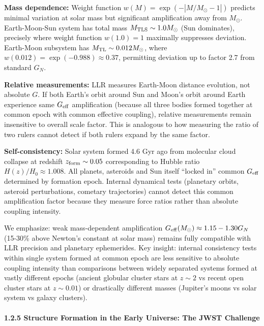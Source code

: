 \documentclass[11pt,a4paper]{article}
\begin{document}
\textbf{Mass dependence:} Weight function
\(w(M) = \exp(-|M/M_\odot - 1|)\) predicts minimal variation at solar
mass but significant amplification away from \(M_\odot\). Earth-Moon-Sun
system has total mass \(M_{\rm TLS} \sim 1.0 M_\odot\) (Sun dominates),
precisely where weight function \(w(1.0) = 1\) maximally suppresses
deviation. Earth-Moon subsystem has \(M_{\rm TL} \sim 0.012 M_\odot\),
where \(w(0.012) = \exp(-0.988) \approx 0.37\), permitting deviation up
to factor 2.7 from standard \(G_N\).

\textbf{Relative measurements:} LLR measures Earth-Moon distance
evolution, not absolute \(G\). If both Earth's orbit around Sun and
Moon's orbit around Earth experience same \(G_{\rm eff}\) amplification
(because all three bodies formed together at common epoch with common
effective coupling), relative measurements remain insensitive to overall
scale factor. This is analogous to how measuring the ratio of two rulers
cannot detect if both rulers expand by the same factor.

\textbf{Self-consistency:} Solar system formed 4.6 Gyr ago from
molecular cloud collapse at redshift \(z_{\rm form} \sim 0.05\)
corresponding to Hubble ratio \(H(z)/H_0 \approx 1.008\). All planets,
asteroids and Sun itself ``locked in'' common \(G_{\rm eff}\) determined
by formation epoch. Internal dynamical tests (planetary orbits, asteroid
perturbations, cometary trajectories) cannot detect this common
amplification factor because they measure force ratios rather than
absolute coupling intensity.

We emphasize: weak mass-dependent amplification
\(G_{\rm eff}(M_\odot) \approx 1.15-1.30 G_N\) (15-30\% above Newton's
constant at solar mass) remains fully compatible with LLR precision and
planetary ephemerides. Key insight: internal consistency tests within
single system formed at common epoch are less sensitive to absolute
coupling intensity than comparisons between widely separated systems
formed at vastly different epochs (ancient globular cluster stars at
\(z \sim 2\) vs recent open cluster stars at \(z \sim 0.01\)) or
drastically different masses (Jupiter's moons vs solar system vs galaxy
clusters).

\hypertarget{structure-formation-in-the-early-universe-the-jwst-challenge}{%
\paragraph{1.2.5 Structure Formation in the Early Universe: The JWST
Challenge}\label{structure-formation-in-the-early-universe-the-jwst-challenge}}
\end{document}
